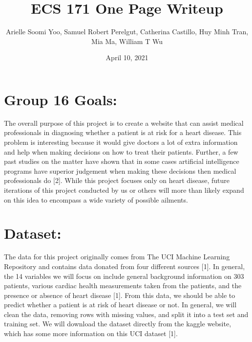 \documentclass[12pt]{article}
\title{\normalsize ECS 171 One Page Writeup}
\author{\small Arielle Soomi Yoo, Samuel Robert Perelgut, Catherina Castillo, Huy Minh Tran, Mia Ma, William T Wu }
\date{April 10, 2021}
\begin{document}
\titlespacing*{\section}{0pt}{0.25cm}{0.25cm}
\titlespacing*{\subsection}{0pt}{0.5cm}{0.5cm}

\maketitle

\section*{\normalsize Group 16 Goals: }

The overall purpose of this project is to create a website that can assist 
medical professionals in diagnosing whether a patient is at risk for a heart 
disease. This problem is interesting because it would give doctors a lot of 
extra information and help when making decisions on how to treat their 
patients. Further, a few past studies on the matter have shown that in some 
cases artificial intelligence programs have superior judgement when making 
these decisions then medical professionals do [2]. While this project focuses 
only on heart disease, future iterations of this project conducted by us or 
others will more than likely expand on this idea to encompass a wide variety 
of possible ailments.

\section*{\normalsize Dataset: }

The data for this project originally comes from The UCI Machine Learning 
Repository and contains data donated from four different sources [1]. In general, 
the 14 variables we will focus on include general background 
information on 303 patients, various cardiac health measurements taken 
from the patients, and the presence or absence of heart disease [1]. 
From this data, we should be able to predict whether a patient is at risk of 
heart disease or not. In general, we will clean the data, removing rows with 
missing values, and split it into a test set and training set. We will 
download the dataset directly from the kaggle website, which has some more 
information on this UCI dataset [1].
\end{document}
